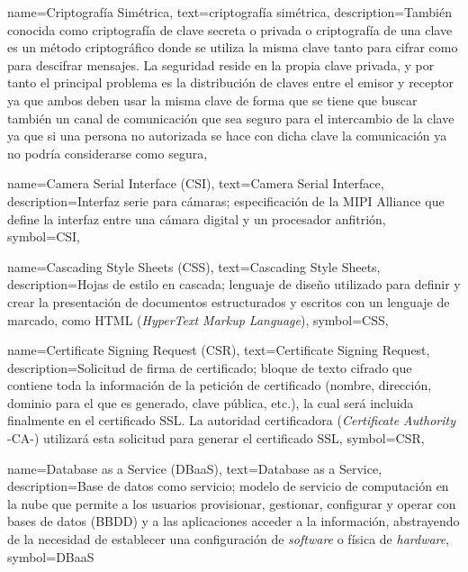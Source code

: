 {
    name={Criptografía Simétrica},
    text={criptografía simétrica},
    description={También conocida como criptografía de clave secreta o privada o criptografía de una clave es un método criptográfico donde se utiliza la misma clave tanto para cifrar como para descifrar mensajes. La seguridad reside en la propia clave privada, y por tanto el principal problema es la distribución de claves entre el emisor y receptor ya que ambos deben usar la misma clave de forma que se tiene que buscar también un canal de comunicación que sea seguro para el intercambio de la clave ya que si una persona no autorizada se hace con dicha clave la comunicación ya no podría considerarse como segura},
}

{
    name={Camera Serial Interface (CSI)},
    text={Camera Serial Interface},
    description={Interfaz serie para cámaras; especificación de la MIPI Alliance que define la interfaz entre una cámara digital y un procesador anfitrión},
    symbol={CSI},
}

{
    name={Cascading Style Sheets (CSS)},
    text={Cascading Style Sheets},
    description={Hojas de estilo en cascada; lenguaje de diseño utilizado para definir y crear la presentación de documentos estructurados y escritos con un lenguaje de marcado, como HTML (\textit{HyperText Markup Language})},
    symbol={CSS},
}

{
    name={Certificate Signing Request (CSR)},
    text={Certificate Signing Request},
    description={Solicitud de firma de certificado; bloque de texto cifrado que contiene toda la información de la petición de certificado (nombre, dirección, dominio para el que es generado, clave pública, etc.), la cual será incluida finalmente en el certificado SSL. La autoridad certificadora (\textit{Certificate Authority} -CA-) utilizará esta solicitud para generar el certificado SSL},
    symbol={CSR},
}

{
    name={Database as a Service (DBaaS)},
    text={Database as a Service},
    description={Base de datos como servicio; modelo de servicio de computación en la nube que permite a los usuarios provisionar, gestionar, configurar y operar con bases de datos (BBDD) y a las aplicaciones acceder a la información, abstrayendo de la necesidad de establecer una configuración de \textit{software} o física de \textit{hardware}},
    symbol={DBaaS}
}

